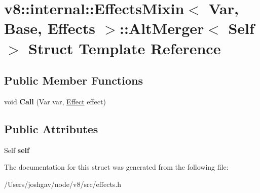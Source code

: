 \hypertarget{structv8_1_1internal_1_1_effects_mixin_1_1_alt_merger}{}\section{v8\+:\+:internal\+:\+:Effects\+Mixin$<$ Var, Base, Effects $>$\+:\+:Alt\+Merger$<$ Self $>$ Struct Template Reference}
\label{structv8_1_1internal_1_1_effects_mixin_1_1_alt_merger}
\subsection*{Public Member Functions}
\begin{DoxyCompactItemize}
\item 
void {\bfseries Call} (Var var, \hyperlink{structv8_1_1internal_1_1_effect}{Effect} effect)\hypertarget{structv8_1_1internal_1_1_effects_mixin_1_1_alt_merger_af4a6516fe49c9b9287f1618f37d357b3}{}\label{structv8_1_1internal_1_1_effects_mixin_1_1_alt_merger_af4a6516fe49c9b9287f1618f37d357b3}

\end{DoxyCompactItemize}
\subsection*{Public Attributes}
\begin{DoxyCompactItemize}
\item 
Self {\bfseries self}\hypertarget{structv8_1_1internal_1_1_effects_mixin_1_1_alt_merger_a89a5575969d2cbfab82bd8726165e2ac}{}\label{structv8_1_1internal_1_1_effects_mixin_1_1_alt_merger_a89a5575969d2cbfab82bd8726165e2ac}

\end{DoxyCompactItemize}


The documentation for this struct was generated from the following file\+:\begin{DoxyCompactItemize}
\item 
/\+Users/joshgav/node/v8/src/effects.\+h\end{DoxyCompactItemize}
